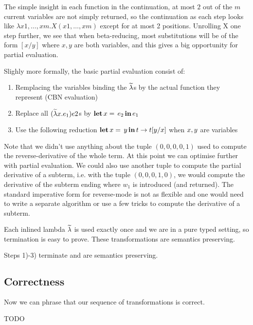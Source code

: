 The simple insight in each function in the continuation, at most $2$ out of the $m$ current variables are not simply returned, so the continuation as each step looks like
$\lambda x1,\ldots,xm.X(x1,\ldots,xm)$ except for at most 2 positions.
Unrolling X one step further, we see that when beta-reducing, most substitutions will be of the form $[x/y]$ where $x,y$ are both variables, 
and this gives a big opportunity for partial evaluation.

Slighly more formally, the basic partial evaluation consist of:
\begin{enumerate}
	\item Remplacing the variables binding the $\widetilde{\lambda}$s by the actual function they represent (CBN evaluation)
	\item Replace all $(\widetilde{\lambda} x.e_1)e2$s by $\mathbf{let}\,x=\,e_2\,\mathbf{in}\,e_1$
	\item Use the following reduction $\letin{\var}{\var[2]}{\trm}\to\trm{}[\var[2]/\var{}]$ when $\var,\var[2]$ are variables
\end{enumerate}

Note that we didn't use anything about the tuple $(0,0,0,0,1)$ used to compute the reverse-derivative of the whole term. 
At this point we can optimise further with partial evaluation. We could also use another tuple to compute the partial derivative of a subterm, 
i.e. with the tuple $(0,0,0,1,0)$, we would compute the derivative of the subterm ending where $w_1$ is introduced (and returned). 
The standard imperative form for reverse-mode is not as flexible and one would need to write a separate algorithm 
or use a few tricks to compute the derivative of a subterm. 

Each inlined lambda $\widetilde{\lambda}$ is used exactly once and we are in a pure typed setting, so termination is easy to prove. These transformations are semantics preserving.

\begin{proposition}
	Steps 1)-3) terminate and are semantics preserving.
\end{proposition}

\subsection{Correctness}

Now we can phrase that our sequence of transformations is correct.

\begin{proposition}
    TODO
\end{proposition}

